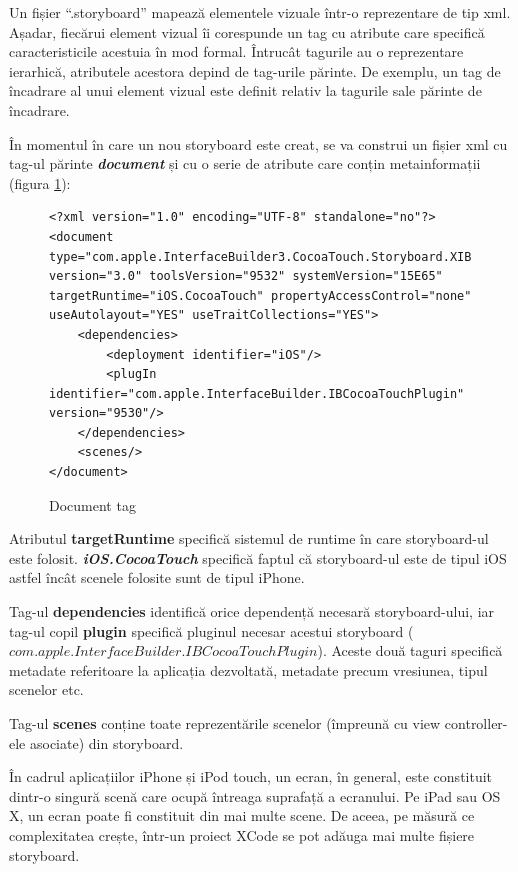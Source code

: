 Un fișier “.storyboard” mapează elementele vizuale într-o reprezentare de tip xml. Așadar, fiecărui element vizual îi corespunde un tag cu atribute care specifică caracteristicile acestuia în mod formal. Întrucât tagurile au o reprezentare ierarhică, atributele acestora depind de tag-urile părinte. De exemplu, un tag de încadrare al unui element vizual este definit relativ la tagurile sale părinte de încadrare.

În momentul în care un nou storyboard este creat, se va construi un fișier xml cu tag-ul părinte \textbf{\textit{document}} și cu o serie de atribute care conțin metainformații (figura \ref{fig:document}):

\begin{figure}[!htbp]
\lstset{language=XML}
\begin{lstlisting}
<?xml version="1.0" encoding="UTF-8" standalone="no"?>
<document type="com.apple.InterfaceBuilder3.CocoaTouch.Storyboard.XIB" version="3.0" toolsVersion="9532" systemVersion="15E65" targetRuntime="iOS.CocoaTouch" propertyAccessControl="none" useAutolayout="YES" useTraitCollections="YES">
    <dependencies>
        <deployment identifier="iOS"/>
        <plugIn identifier="com.apple.InterfaceBuilder.IBCocoaTouchPlugin" version="9530"/>
    </dependencies>
    <scenes/>
</document>
\end{lstlisting}
\caption{Document tag}\label{fig:document}
\end{figure}

Atributul \textbf{targetRuntime}  specifică sistemul de runtime în care storyboard-ul este folosit. \textbf{\textit{iOS.CocoaTouch}} specifică faptul că storyboard-ul este de tipul iOS astfel încât scenele folosite sunt de tipul iPhone.

Tag-ul \textbf{dependencies} identifică orice dependență necesară storyboard-ului, iar tag-ul copil \textbf{plugin} specifică pluginul necesar acestui storyboard ($com.apple.InterfaceBuilder.IBCocoaTouchPlugin$). Aceste două taguri specifică metadate referitoare la aplicația dezvoltată, metadate precum vresiunea, tipul scenelor etc.

Tag-ul \textbf{scenes} conține toate reprezentările scenelor (împreună cu view controller-ele asociate) din storyboard.

În cadrul aplicațiilor iPhone și iPod touch, un ecran, în general, este constituit dintr-o singură scenă care ocupă întreaga suprafață a ecranului. Pe iPad sau OS X, un ecran poate fi constituit din mai multe scene. De aceea, pe măsură ce complexitatea crește, într-un proiect XCode se pot adăuga mai multe fișiere storyboard.

